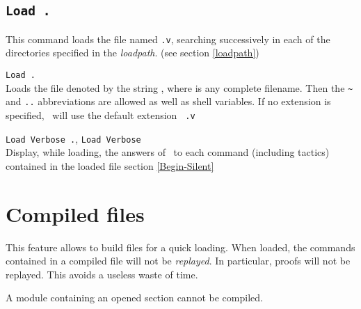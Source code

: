 \subsection{\tt Load {\ident}.}
\label{Load}
This command loads the file named {\ident}{\tt .v}, searching
successively in each of the directories specified in the {\em
  loadpath}. (see section \ref{loadpath})

\begin{Variants}
\item {\tt Load {\str}.}\label{Load-str}\\
  Loads the file denoted by the string {\str}, where {\str} is any
  complete filename. Then the \verb.~. and {\tt ..}
  abbreviations are allowed as well as shell variables. If no
  extension is specified, \Coq\ will use the default extension {\tt
    .v}
\item {\tt Load Verbose {\ident}.}, 
  {\tt Load Verbose {\str}}\\
  Display, while loading, the answers of \Coq\ to each command
  (including tactics) contained in the loaded file
  \SeeAlso section \ref{Begin-Silent}
\end{Variants}

\begin{ErrMsgs}
\item {}
\end{ErrMsgs}

\section{Compiled files}\label{compiled}

This feature allows to build files for a quick loading. When loaded,
the commands contained in a compiled file will not be {\em replayed}.
In particular, proofs will not be replayed. This avoids a useless
waste of time.

\Rem A module containing an opened section cannot be compiled. 


